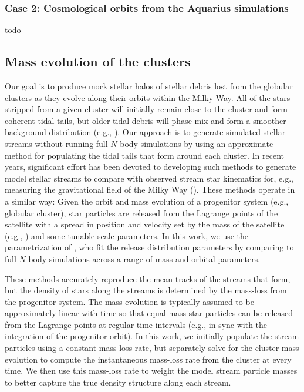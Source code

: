 \documentclass[manuscript, letterpaper]{aastex6}
\begin{document}
\subsubsection{Case 2: Cosmological orbits from the Aquarius simulations} \label{sec:cosmoorbits}

todo

\subsection{Mass evolution of the clusters} \label{sec:mockstreams}

Our goal is to produce mock stellar halos of stellar debris lost from the
globular clusters as they evolve along their orbits within the Milky Way.
All of the stars stripped from a given cluster will initially remain close to
the cluster and form coherent tidal tails, but older tidal debris will phase-mix
and form a smoother background distribution (e.g., \citealt{Helmi:1999}).
Our approach is to generate simulated stellar streams without running full
$N$-body simulations by using an approximate method for populating the tidal
tails that form around each cluster.
In recent years, significant effort has been devoted to developing such methods
to generate model stellar streams to compare with observed stream star
kinematics for, e.g., measuring the gravitational field of the Milky Way
(\citealt{Kupper:2012,Bonaca:2014,Gibbons:2014,Bovy:2014,Fardal:2015}).
These methods operate in a similar way:
Given the orbit and mass evolution of a progenitor system (e.g., globular
cluster), star particles are released from the Lagrange points of the satellite
with a spread in position and velocity set by the mass of the satellite (e.g.,
\citealt{Johnston:1999}) and some tunable scale parameters.
In this work, we use the parametrization of \citealt{Fardal:2015}, who fit the
release distribution parameters by comparing to full $N$-body simulations across
a range of mass and orbital parameters.

These methods accurately reproduce the mean tracks of the streams that form, but
the density of stars along the streams is determined by the mass-loss from the
progenitor system.
The mass evolution is typically assumed to be approximately linear with time so
that equal-mass star particles can be released from the Lagrange points at
regular time intervals (e.g., in sync with the integration of the progenitor
orbit).
In this work, we initially populate the stream particles using a constant
mass-loss rate, but separately solve for the cluster mass evolution to compute
the instantaneous mass-loss rate from the cluster at every time.
We then use this mass-loss rate to weight the model stream particle masses
to better capture the true density structure along each stream.
\end{document}
